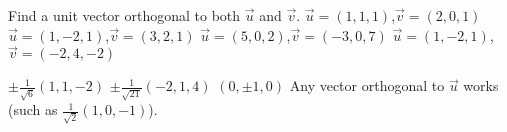 
\begin{Exercise}[
name={},
title={}, 
difficulty=0,
origin={\cite{GHC}}]
Find a unit vector orthogonal to both $\vec u$ and $\vec v$.
\Question $\vec u = (1,1,1)$,\quad $\vec v=(2,0,1)$
\Question $\vec u = (1,-2,1)$,\quad $\vec v=(3,2,1)$
\Question $\vec u = (5,0,2)$,\quad $\vec v=(-3,0,7)$
\Question $\vec u = (1,-2,1)$,\quad $\vec v=(-2,4,-2)$

\end{Exercise}

\begin{Answer}
\Question $\pm\frac{ 1}{\sqrt{6}}(1,1,-2)$
\Question $\pm\frac{ 1}{\sqrt{21}}(-2,1,4)$
\Question $(0,\pm 1,0) $
\Question Any vector orthogonal to $\vec u$ works (such as $\frac{1}{\sqrt{2}}(1,0,-1)$).

\end{Answer}
